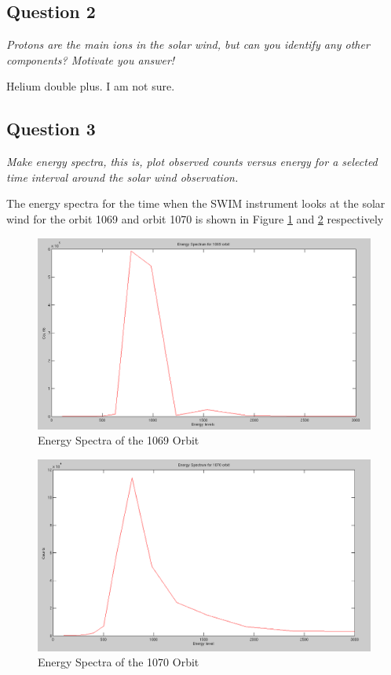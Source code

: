 \documentclass{article}
\begin{document}
\subsection{Question 2}
\textit{Protons are the main ions in the solar wind, but can you identify any other
components? Motivate you answer!}

{\color{red} Helium double plus. I am not sure.}

\subsection{Question 3}
\textit{Make energy spectra, this is, plot observed counts versus energy for a selected
time interval around the solar wind observation.}

The energy spectra for the time when the SWIM instrument looks at the solar wind for the orbit 1069 and orbit 1070 is shown in Figure \ref{fig:energy_spectra_1069} and \ref{fig:energy_spectra_1070} respectively

\begin{figure}[h!]
\centering
\includegraphics[scale = 0.35]{Figures/energy_spectra_1069.png}
\caption{Energy Spectra of the 1069 Orbit}
\label{fig:energy_spectra_1069}
\end{figure}

\begin{figure}[h!]
\centering
\includegraphics[scale = 0.35]{Figures/energy_spectra_1070.png}
\caption{Energy Spectra of the 1070 Orbit}
\label{fig:energy_spectra_1070}
\end{figure}
\end{document}
